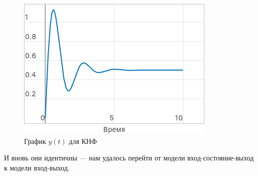 \documentclass[a4paper]{article}
\begin{document}
\begin{figure}[H]
\begin{minipage}{0.32\textwidth}
    \end{minipage}
    \hfill
    \begin{minipage}{0.32\textwidth}
        \includegraphics[width=\textwidth]{sources/task2_knf.png}
        \caption*{График $y(t)$ для КНФ}
    \end{minipage}
\end{figure}
И вновь они идентичны --- нам удалось перейти от модели вход-состояние-выход к модели вход-выход.
\end{document}
